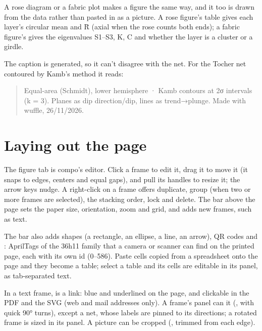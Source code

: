 A rose diagram or a fabric plot makes a figure the same way, and it too is drawn from the data rather
than pasted in as a picture. A rose figure's table gives each layer's circular mean and R̄ (axial when the
rose counts both ends); a fabric figure's gives the eigenvalues S1–S3, K, C and whether the layer is a
cluster or a girdle.

The caption is generated, so it can't disagree with the net. For the Tocher net contoured by Kamb's
method it reads:

\begin{quote}\small
Equal-area (Schmidt), lower hemisphere · Kamb contours at 2σ intervals (k = 3). Planes as dip
direction/dip, lines as trend→plunge. Made with wuffle, 26/11/2026.
\end{quote}


\section{Laying out the page}

The figure tab is compo's editor. Click a frame to edit it, drag it to move it (it snaps to edges, centers
and equal gaps), and pull its handles to resize it; the arrow keys nudge. A right-click on a frame offers
duplicate, group (when two or more frames are selected), the stacking order, lock and delete. The bar
above the page sets the paper size, orientation, zoom and grid, and adds new frames, such as text.

The bar also adds shapes (a rectangle, an ellipse, a line, an arrow), QR codes and : AprilTags
of the 36h11 family that a camera or scanner can find on the printed page, each with its own id
(0–586). Paste cells copied from a spreadsheet onto the page and they become a table; select a table and
its cells are editable in its panel, as tab-separated text.

In a text frame,  is a link: blue and underlined on the page,
and clickable in the PDF and the SVG (web and mail addresses only). A frame's panel can  it
(, with quick 90° turns), except a net, whose labels are pinned to its directions; a rotated
frame is sized in its panel. A picture can be cropped (, trimmed from each edge).

